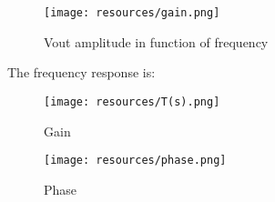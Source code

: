 \begin{figure} [!htb] 
  \texttt{[image: resources/gain.png]}
  \caption{Vout amplitude in function of frequency} 
  \label{fig:theoplots}
  \endminipage\hfill
\end{figure}

\FloatBarrier

The frequency response is:

\begin{figure} [!htb] 
  \texttt{[image: resources/T(s).png]}
  \caption{Gain} 
  \label{fig:theoplots}
  \endminipage\hfill
\end{figure}

\FloatBarrier

\begin{figure} [!htb] 
  \texttt{[image: resources/phase.png]}
  \caption{Phase} 
  \label{fig:theoplots}
  \endminipage\hfill
\end{figure}

\FloatBarrier




